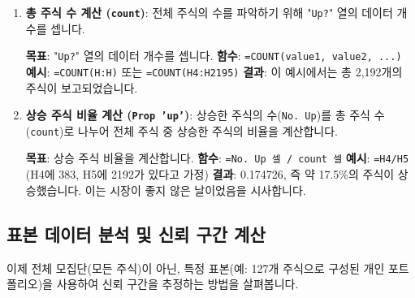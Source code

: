 \documentclass[11pt,a4paper]{book}
\newcommand{\excel}[1]{\texttt{#1}}
\theoremstyle{definition}
\begin{document}
\begin{enumerate}
    \item \textbf{총 주식 수 계산 (\excel{count})}:
    전체 주식의 수를 파악하기 위해 "\excel{Up?}" 열의 데이터 개수를 셉니다.
    \begin{examplebox}[title=Excel COUNT 함수 사용법]
        \textbf{목표}: "\excel{Up?}" 열의 데이터 개수를 셉니다.
        \textbf{함수}: \texttt{=COUNT(value1, value2, ...)}
        \textbf{예시}: \texttt{=COUNT(H:H)} 또는 \texttt{=COUNT(H4:H2195)}
        \textbf{결과}: 이 예시에서는 총 2,192개의 주식이 보고되었습니다.
    \end{examplebox}

    \item \textbf{상승 주식 비율 계산 (\excel{Prop 'up'})}:
    상승한 주식의 수(\excel{No. Up})를 총 주식 수(\excel{count})로 나누어 전체 주식 중 상승한 주식의 비율을 계산합니다.
    \begin{examplebox}[title=Excel 비율 계산]
        \textbf{목표}: 상승 주식 비율을 계산합니다.
        \textbf{함수}: \texttt{=No. Up 셀 / count 셀}
        \textbf{예시}: \texttt{=H4/H5} (H4에 383, H5에 2192가 있다고 가정)
        \textbf{결과}: 0.174726, 즉 약 17.5\%의 주식이 상승했습니다. 이는 시장이 좋지 않은 날이었음을 시사합니다.
    \end{examplebox}
\end{enumerate}

\subsection{표본 데이터 분석 및 신뢰 구간 계산}
이제 전체 모집단(모든 주식)이 아닌, 특정 표본(예: 127개 주식으로 구성된 개인 포트폴리오)을 사용하여 신뢰 구간을 추정하는 방법을 살펴봅니다.
\end{document}

